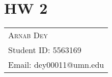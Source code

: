 \section{HW 2}
\begin{tabularx}{\textwidth}{l}
	\hspace*{-0.8cm}\large\textsc{Arnab Dey}\\
	\hspace*{-0.8cm}Student ID: 5563169\\
	\hspace*{-0.8cm}Email: dey00011@umn.edu\\
\end{tabularx}
\bigskip
\par
